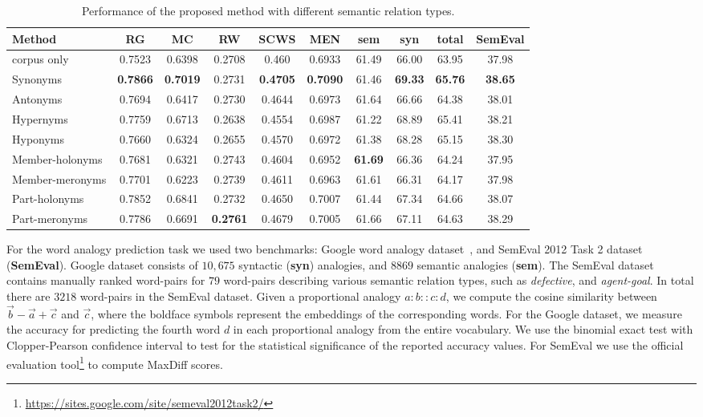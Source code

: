 \documentclass[letterpaper]{article}
\newcommand{\citep}{\cite}
\begin{document}
\begin{table}[t!]
\small
\centering
\caption{Performance of the proposed method with different semantic relation types.}
\label{tbl:overall}
\begin{tabular}{|l|c|c|c|c|c|c|c|c|c|} \hline
Method & RG & MC & RW & SCWS & MEN & sem & syn & total & SemEval \\ \hline \hline
corpus only  & 0.7523 & 0.6398 & 0.2708 & 0.460 & 0.6933 & 61.49 & 66.00 & 63.95 & 37.98 \\
Synonyms & \textbf{0.7866} & \textbf{0.7019} & 0.2731 & \textbf{0.4705} & \textbf{0.7090} & 61.46 & \textbf{69.33} & \textbf{65.76} & \textbf{38.65} \\
Antonyms & 0.7694 & 0.6417 & 0.2730 & 0.4644 & 0.6973 & 61.64 & 66.66 & 64.38 & 38.01 \\
Hypernyms & 0.7759 & 0.6713 & 0.2638 & 0.4554 & 0.6987 & 61.22 & 68.89 & 65.41 & 38.21 \\
Hyponyms & 0.7660 & 0.6324 & 0.2655 & 0.4570 & 0.6972 & 61.38 & 68.28 & 65.15 & 38.30 \\
Member-holonyms & 0.7681 & 0.6321 & 0.2743 & 0.4604 & 0.6952 & \textbf{61.69} & 66.36 & 64.24 & 37.95 \\
Member-meronyms & 0.7701 & 0.6223 & 0.2739 & 0.4611 & 0.6963 & 61.61 & 66.31 & 64.17 & 37.98 \\
Part-holonyms & 0.7852 & 0.6841 & 0.2732 & 0.4650 & 0.7007 & 61.44 & 67.34 & 64.66 & 38.07 \\
Part-meronyms & 0.7786 & 0.6691 & \textbf{0.2761} & 0.4679 & 0.7005 & 61.66 & 67.11 & 64.63 & 38.29 \\
 \hline
\end{tabular}
\end{table}

For the word analogy prediction task we used two benchmarks: Google word analogy dataset~\citep{Mikolov:NIPS:2013},
and SemEval 2012 Task 2 dataset~\citep{SemEavl2012:Task2} (\textbf{SemEval}).
Google dataset consists of $10,675$ syntactic (\textbf{syn}) analogies, and $8869$ semantic analogies (\textbf{sem}).
The SemEval dataset contains manually ranked word-pairs
for $79$ word-pairs describing various semantic relation types, such as \emph{defective}, and \emph{agent-goal}.
In total there are $3218$ word-pairs in the SemEval dataset.
Given a proportional analogy  $a:b :: c:d$, we compute the cosine similarity between $\vec{b} - \vec{a} + \vec{c}$ and
$\vec{c}$, where the boldface symbols represent the embeddings of the corresponding words. For the Google dataset, we measure the
accuracy for predicting the fourth word $d$ in each proportional analogy from the entire vocabulary.
We use the binomial exact test with Clopper-Pearson confidence interval to test for the statistical significance of
the reported accuracy values.
For SemEval we use the official evaluation tool\footnote{\url{https://sites.google.com/site/semeval2012task2/}}
to compute MaxDiff scores.
\end{document}
